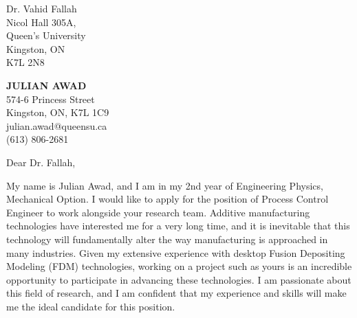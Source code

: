 \documentclass[11pt]{letter} %
\begin{document}
\begin{letter}{Dr. Vahid Fallah \\
Nicol Hall 305A, \\
Queen's University \\
Kingston, ON \\
K7L 2N8}

\begin{center}
\textbf{\huge JULIAN AWAD} \\ %
\vspace{1em} %
574-6 Princess Street \\ Kingston, ON, K7L 1C9 \\ julian.awad@queensu.ca \\ (613) 806-2681 %
\end{center}
\hspace{0em}
\signature{Julian Awad} %
\vspace{-1in}
\opening{Dear Dr. Fallah,}

My name is Julian Awad, and I am in my 2nd year of Engineering Physics, Mechanical Option. I would like to apply for the position of Process Control Engineer to work alongside your research team. Additive manufacturing technologies have interested me for a very long time, and it is inevitable that this technology will fundamentally alter the way manufacturing is approached in many industries. Given my extensive experience with desktop Fusion Depositing Modeling (FDM) technologies, working on a project such as yours is an incredible opportunity to participate in advancing these technologies. I am passionate about this field of research, and I am confident that my experience and skills will make me the ideal candidate for this position.


\end{letter}
\end{document}

